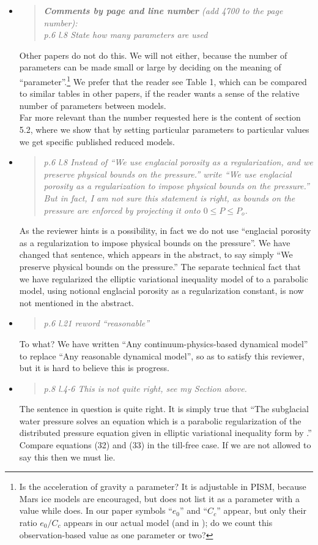 \documentclass[11pt,reqno]{amsart}
\newcommand{\reply}[2]{
\medskip\medskip
\item  \begin{quote}
\emph{#1}
\end{quote}

\medskip
\noindent #2}
\begin{document}
\begin{itemize}
\reply{\textbf{Comments by page and line number} (add 4700 to the page number):\\
\indent p.6 l.8 State how many parameters are used}
{Other papers do not do this.  We will not either, because the number of parameters can be made small or large by deciding on the meaning of ``parameter''.\footnote{Is the acceleration of gravity a parameter?  It is adjustable in PISM, because Mars ice models are encouraged, but \cite{deFleurianetal2014} does not list it as a parameter with a value while \cite{Werderetal2013} does.  In our paper symbols ``$e_0$'' and ``$C_c$'' appear, but only their ratio $e_0/C_c$ appears in our actual model (and in \cite{Tulaczyketal2000}); do we count this observation-based value as one parameter or two?}  We prefer that the reader see Table 1, which can be compared to similar tables in other papers, if the reader wants a sense of the relative number of parameters between models.\\
\indent Far more relevant than the number requested here is the content of section 5.2, where we show that by setting particular parameters to particular values we get specific published reduced models.}

\reply{p.6 l.8 Instead of ``We use englacial porosity as a regularization, and we preserve
physical bounds on the pressure.'' write ``We use englacial porosity as a regularization to impose physical bounds on the pressure.''  But in fact, I am not sure this statement is right, as bounds on the pressure are enforced by projecting it onto $0 \le P \le P_o$.}
{As the reviewer hints is a possibility, in fact we do not use ``englacial porosity as a regularization to impose physical bounds on the pressure''.  We have changed that sentence, which appears in the abstract, to say simply ``We preserve physical bounds on the pressure.''  The separate technical fact that we have regularized the elliptic variational inequality model of \cite{Schoofetal2012} to a parabolic model, using notional englacial porosity as a regularization constant, is now not mentioned in the abstract.}

\reply{p.6 l.21 reword ``reasonable''}
{To what?  We have written ``Any continuum-physics-based dynamical model'' to replace ``Any reasonable dynamical model'', so as to satisfy this reviewer, but it is hard to believe this is progress.}

\reply{p.8 l.4-6 This is not quite right, see my Section above.}
{The sentence in question is quite right.  It is simply true that ``The subglacial water pressure solves an equation which is a parabolic regularization of the distributed pressure equation given in elliptic variational inequality form by \cite{Schoofetal2012}.''  Compare equations (32) and (33) in the till-free case.  If we are not allowed to say this then we must lie.}


\end{itemize}
\end{document}
